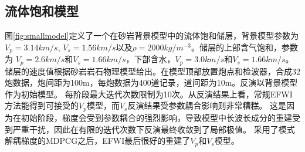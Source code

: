 \subsection{流体饱和模型}
图\ref{fig:smallmodel}定义了一个在砂岩背景模型中的流体饱和储层，背景模型参数为$V_p=3.14 km/s$, $V_s=1.56 km/s$以及$\rho=2000 kg/m^{-3}$。储层的上部含气饱和，参数为
$V_p=2.6 km/s$和$V_s=1.66 km/s$，下部含水，$V_p=3.0 km/s$和$V_s=1.66 km/s$。
储层的速度值根据砂岩岩石物理模型给出\cite[]{mavko2009rock}。在模型顶部放置炮点和检波器，合成32炮数据，炮间距为100m，每炮数据为400道记录，道间距为10m。反演以背景模型作为初始模型。
每阶段最大迭代次数限制为10次。从反演结果上看，常规EFWI方法能得到可接受的$V_p$模型，而$V_s$反演结果受参数耦合影响则非常糟糕。
这是因为在初始阶段，梯度会受到参数耦合的强烈影响，导致模型中长波长成分的重建受到严重干扰，因此在有限的迭代次数下反演最终收敛到了局部极值。
采用了模式解耦梯度的MDPCG之后，EFWI最后很好的重建了$V_p$和$V_s$模型。
